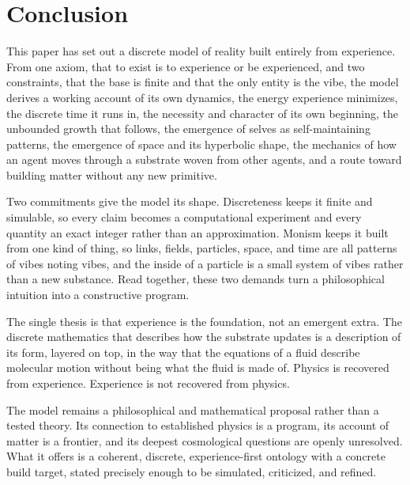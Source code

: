 \section{Conclusion}
\label{sec:conclusion}

This paper has set out a discrete model of reality built entirely from experience. From one axiom, that to exist is to experience or be experienced, and two constraints, that the base is finite and that the only entity is the vibe, the model derives a working account of its own dynamics, the energy experience minimizes, the discrete time it runs in, the necessity and character of its own beginning, the unbounded growth that follows, the emergence of selves as self-maintaining patterns, the emergence of space and its hyperbolic shape, the mechanics of how an agent moves through a substrate woven from other agents, and a route toward building matter without any new primitive.

Two commitments give the model its shape. Discreteness keeps it finite and simulable, so every claim becomes a computational experiment and every quantity an exact integer rather than an approximation. Monism keeps it built from one kind of thing, so links, fields, particles, space, and time are all patterns of vibes noting vibes, and the inside of a particle is a small system of vibes rather than a new substance. Read together, these two demands turn a philosophical intuition into a constructive program.

The single thesis is that experience is the foundation, not an emergent extra. The discrete mathematics that describes how the substrate updates is a description of its form, layered on top, in the way that the equations of a fluid describe molecular motion without being what the fluid is made of. Physics is recovered from experience. Experience is not recovered from physics.

The model remains a philosophical and mathematical proposal rather than a tested theory. Its connection to established physics is a program, its account of matter is a frontier, and its deepest cosmological questions are openly unresolved. What it offers is a coherent, discrete, experience-first ontology with a concrete build target, stated precisely enough to be simulated, criticized, and refined.
